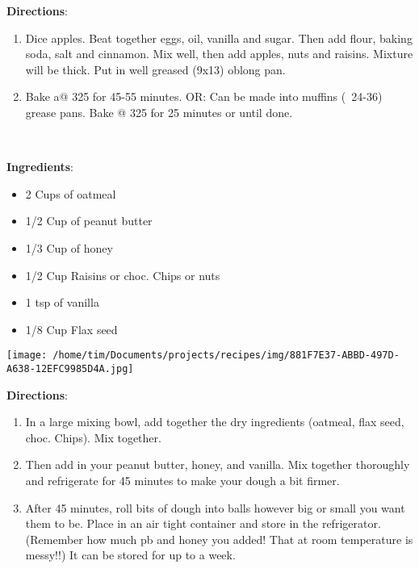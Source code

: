 \documentclass[11pt, twoside, openany]{book}
\begin{document}
\textbf{Directions}:
\vspace{-3mm}\begin{enumerate}\setlength\itemsep{-1mm}
\item Dice apples. Beat together eggs, oil, vanilla and sugar. Then add flour, baking soda, salt and cinnamon. Mix well, then add apples, nuts and raisins. Mixture will be thick. Put in well greased (9x13) oblong pan. 
\item Bake a@ 325 for 45-55 minutes. 
OR:
Can be made into muffins (~24-36) grease pans. Bake @ 325 for 25 minutes or until done.
\end{enumerate}
 \label{power-balls-(no-bake-oatmeal-balls)}\hfill\textit{}\\
\begin{minipage}[t]{0.8\linewidth}
\textbf{Ingredients}:\vspace{-3mm}
\begin{multicols}{2}
\begin{itemize}\setlength\itemsep{-1mm}
\item 2 Cups of oatmeal
\item 1/2 Cup of peanut butter
\item 1/3 Cup of honey
\item 1/2 Cup Raisins or choc. Chips or nuts
\item 1 tsp of vanilla
\item 1/8 Cup Flax seed
\end{itemize}
\end{multicols}
\end{minipage}
\begin{minipage}[t]{0.2\linewidth}
\centering \strut\vspace*{-\baselineskip}\newline
\texttt{[image: /home/tim/Documents/projects/recipes/img/881F7E37-ABBD-497D-A638-12EFC9985D4A.jpg]}\\
\end{minipage}\vspace{3mm}
\textbf{Directions}:
\vspace{-3mm}\begin{enumerate}\setlength\itemsep{-1mm}
\item In a large mixing bowl, add together the dry ingredients (oatmeal, flax seed, choc. Chips). Mix together.
\item Then add in your peanut butter, honey, and vanilla. Mix together thoroughly and refrigerate for 45 minutes to make your dough a bit firmer.
\item After 45 minutes, roll bits of dough into balls however big or small you want them to be. Place in an air tight container and store in the refrigerator. (Remember how much pb and honey you added! That at room temperature is messy!!) It can be stored for up to a week.
\end{enumerate}
\end{document}
